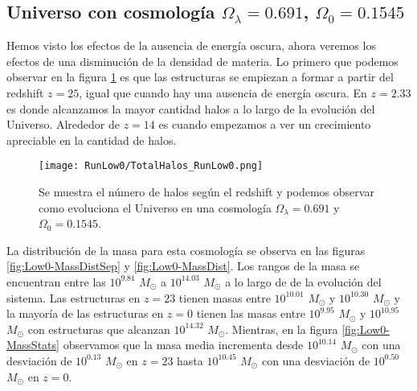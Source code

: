 
\subsection{Universo con cosmología \texorpdfstring{$\Omega_\lambda = 0.691$, $\Omega_0 = 0.1545$ }{Omega lambda = 0.691, Omega 0 = 0.1545}  }

Hemos visto los efectos de la ausencia de energía oscura, ahora veremos los efectos de una disminución de la densidad de materia. Lo primero que podemos observar en la figura \ref{fig:Low0_TotalHalos} es que las estructuras se empiezan a formar a partir del redshift $z=25$, igual que cuando hay una ausencia de energía oscura. En $z= 2.33$ es donde alcanzamos la mayor cantidad halos a lo largo de la evolución del Universo. Alrededor de $z = 14$ es cuando empezamos a ver un crecimiento apreciable en la cantidad de halos.

\begin{figure}[H]
    \centering
    \texttt{[image: RunLow0/TotalHalos\_RunLow0.png]}
    \caption[Evolución del número de halos en un Universo $\Omega_\lambda = 0.691$, $\Omega_0 = 0.1545$]{\footnotesize Se muestra el número de halos según el redshift y podemos observar como evoluciona el Universo en una cosmología $\Omega_\lambda = 0.691 $ y $\Omega_0 = 0.1545$.}
    \label{fig:Low0_TotalHalos}
\end{figure}

La distribución de la masa para esta cosmología se observa en las figuras \ref{fig:Low0-MassDistSep} y \ref{fig:Low0-MassDist}. Los rangos de la masa se encuentran entre las $10^{9.81}$ $M_\odot$ a $10^{14.03}$ $M_\odot$ a lo largo de de la evolución del sistema. Las estructuras en $z=23$ tienen masas entre $10^{10.01}$ $M_\odot$ y $10^{10.30}$ $M_\odot$ y la mayoría de las estructuras en $z=0$ tienen las masas entre $10^{9.95}$ $M_\odot$ y $10^{10.95}$ $M_\odot$ con estructuras que alcanzan $10^{14.32}$ $M_\odot$. Mientras, en la figura \ref{fig:Low0-MassStats} observamos que la masa media incrementa desde $10^{10.14}$ $M_\odot$ con una desviación de $10^{0.13}$ $M_\odot$ en $z=23$ hasta $10^{10.45}$ $M_\odot$ con una desviación de $10^{0.50}$ $M_\odot$ en $z=0$.

